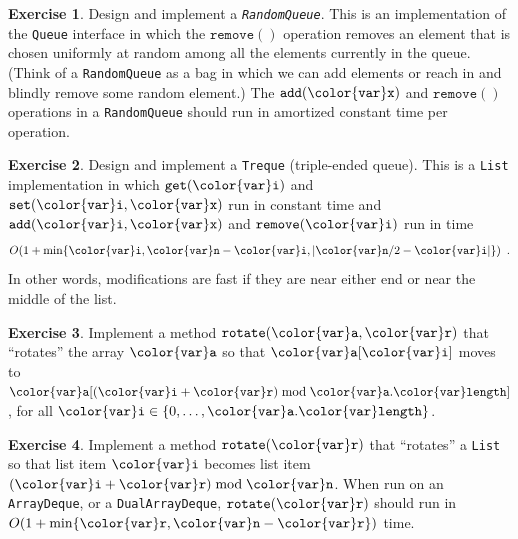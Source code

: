 \documentclass[10pt]{book}
\theoremstyle{plain}
\theoremstyle{definition}
\newtheorem{exc}{Exercise}[chapter]
\begin{document}
\begin{exc}
  Design and implement a \emph{\texttt{RandomQueue}}.
  This is an implementation
  of the \texttt{Queue} interface in which the \ensuremath{\mathtt{remove()}} operation removes
  an element that is chosen uniformly at random among all the elements
  currently in the queue.  (Think of a \texttt{RandomQueue} as a bag in which
  we can add elements or reach in and blindly remove some random element.)
  The \ensuremath{\mathtt{add({\color{var}x})}} and \ensuremath{\mathtt{remove()}} operations in a \texttt{RandomQueue} should run
  in amortized constant time per operation.
\end{exc}

\begin{exc}
  Design and implement a \texttt{Treque} (triple-ended queue). 
  This is a \texttt{List}
  implementation in which \ensuremath{\mathtt{get({\color{var}i})}} and \ensuremath{\mathtt{set({\color{var}i},{\color{var}x})}} run in constant time
  and \ensuremath{\mathtt{add({\color{var}i},{\color{var}x})}} and \ensuremath{\mathtt{remove({\color{var}i})}} run in time
  \[
     O(1+\min\{\ensuremath{\mathtt{{\color{var}i}}}, \ensuremath{\mathtt{{\color{var}n}}}-\ensuremath{\mathtt{{\color{var}i}}}, |\ensuremath{\mathtt{{\color{var}n}}}/2-\ensuremath{\mathtt{{\color{var}i}}}|\}) \enspace .
  \]
  In other words, modifications are fast if they are near either
  end or near the middle of the list.
\end{exc}

\begin{exc}
  Implement a method \ensuremath{\mathtt{rotate({\color{var}a},{\color{var}r})}} that ``rotates'' the array \ensuremath{\mathtt{{\color{var}a}}}
  so that \ensuremath{\mathtt{{\color{var}a}[{\color{var}i}]}} moves to $\ensuremath{\mathtt{{\color{var}a}}}[(\ensuremath{\mathtt{{\color{var}i}}}+\ensuremath{\mathtt{{\color{var}r}}})\bmod \ensuremath{\mathtt{{\color{var}a}.{\color{var}length}}}]$, for all
  $\ensuremath{\mathtt{{\color{var}i}}}\in\{0,\ldots,\ensuremath{\mathtt{{\color{var}a}.{\color{var}length}}}\}$.
\end{exc}

\begin{exc}
  Implement a method \ensuremath{\mathtt{rotate({\color{var}r})}} that ``rotates'' a \texttt{List} so that
  list item \ensuremath{\mathtt{{\color{var}i}}} becomes list item $(\ensuremath{\mathtt{{\color{var}i}}}+\ensuremath{\mathtt{{\color{var}r}}})\bmod \ensuremath{\mathtt{{\color{var}n}}}$.  When run on
  an \texttt{ArrayDeque}, or a \texttt{DualArrayDeque}, \ensuremath{\mathtt{rotate({\color{var}r})}} should run in
  $O(1+\min\{\ensuremath{\mathtt{{\color{var}r}}},\ensuremath{\mathtt{{\color{var}n}}}-\ensuremath{\mathtt{{\color{var}r}}}\})$ time.
\end{exc}
\end{document}
